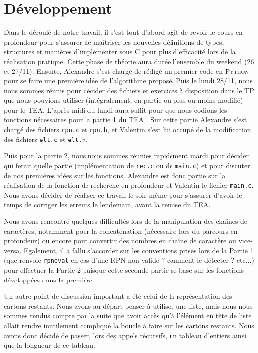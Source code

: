\documentclass[11pt]{article}
\begin{document}
\section{Développement}

\quad \quad Dans le déroulé de notre travail, il s’est tout d’abord agit de revoir le cours en profondeur pour s’assurer de maîtriser les nouvelles définitions de types, structures et manières d’implémenter sous \textsc{C} pour plus d’efficacité lors de la réalisation pratique. Cette phase de théorie aura durée l’ensemble du weekend (26 et 27/11). Ensuite, Alexandre s’est chargé de rédigé un premier code en \textsc{Python} pour se faire une première idée de l'algorithme proposé. Puis le lundi 28/11, nous nous sommes réunis pour décider des fichiers et exercices à disposition dans le TP que nous pouvions utiliser (intégralement, en partie ou plus ou moins modifié) pour le TEA. L’après midi du lundi aura suffit pour que nous codions les fonctions nécessaires pour la partie 1 du TEA . Sur cette partie Alexandre s’est chargé des fichiers \texttt{rpn.c} et \texttt{rpn.h}, et Valentin s’est lui occupé de la modification des fichiers \texttt{elt.c} et \texttt{elt.h}.

Puis pour la partie 2, nous nous sommes réunies rapidement mardi pour décider qui ferait quelle partie (implémentation de \texttt{rec.c} ou de \texttt{main.c}) et pour discuter de nos premières idées sur les fonctions. Alexandre est donc partie sur la réalisation de la fonction de recherche en profondeur et Valentin le fichier \texttt{main.c}. Nous avons décider de réaliser ce travail le soir même pour s’assurer d’avoir le temps de corriger les erreurs le lendemain, avant la remise du TEA.

Nous avons rencontré quelques difficultés lors de la manipulation des chaînes de caractères, notamment pour la concaténation (nécessaire lors du parcours en profondeur) ou encore pour convertir des nombres en chaîne de caractère ou vice-versa. Egalement, il a fallu s'accorder sur les conventions prises lors de la Partie 1 (que renvoie \texttt{rpn\textunderscore eval} en cas d'une RPN non valide ? comment le détecter ? etc...) pour effectuer la Partie 2 puisque cette seconde partie se base sur les fonctions développées dans la première.

Un autre point de discussion important a été celui de la représentation des cartons restants. Nous avons au départ penser à utiliser une liste, mais nous nous sommes rendus compte par la suite que avoir accès qu'à l'élément en tête de liste allait rendre inutilement compliqué la boucle à faire sur les cartons restants. Nous avons donc décidé de passer, lors des appels récursifs, un tableau d'entiers ainsi que la longueur de ce tableau.
\end{document}
